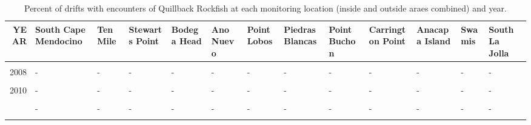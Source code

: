 \documentclass[
]{article}
\begin{document}
\begin{landscape}\begin{table}

\caption{\label{tab:percentpos}Percent of drifts with encounters of Quillback Rockfish at each monitoring location (inside and outside araes combined) and year.}
\centering
\begin{tabular}[t]{r>{\raggedright\arraybackslash}p{1.7cm}>{\raggedright\arraybackslash}p{1.2cm}>{\raggedright\arraybackslash}p{1.2cm}>{\raggedright\arraybackslash}p{1.2cm}>{\raggedright\arraybackslash}p{1.2cm}>{\raggedright\arraybackslash}p{1.2cm}>{\raggedright\arraybackslash}p{1.2cm}>{\raggedright\arraybackslash}p{1.2cm}>{\raggedright\arraybackslash}p{1.7cm}>{\raggedright\arraybackslash}p{1.2cm}>{\raggedright\arraybackslash}p{1.2cm}l}
\toprule
YEAR & South Cape Mendocino & Ten Mile & Stewarts Point & Bodega Head & Ano Nuevo & Point Lobos & Piedras Blancas & Point Buchon & Carrington Point & Anacapa Island & Swamis & South La Jolla\\
\midrule
\cellcolor{gray!6}{2007} & \cellcolor{gray!6}{-} & \cellcolor{gray!6}{-} & \cellcolor{gray!6}{-} & \cellcolor{gray!6}{-} & \cellcolor{gray!6}{-} & \cellcolor{gray!6}{-} & \cellcolor{gray!6}{-} & \cellcolor{gray!6}{-} & \cellcolor{gray!6}{-} & \cellcolor{gray!6}{-} & \cellcolor{gray!6}{-} & \cellcolor{gray!6}{-}\\
2008 & - & - & - & - & - & - & - & - & - & - & - & -\\
\cellcolor{gray!6}{2009} & \cellcolor{gray!6}{-} & \cellcolor{gray!6}{-} & \cellcolor{gray!6}{-} & \cellcolor{gray!6}{-} & \cellcolor{gray!6}{-} & \cellcolor{gray!6}{-} & \cellcolor{gray!6}{-} & \cellcolor{gray!6}{-} & \cellcolor{gray!6}{-} & \cellcolor{gray!6}{-} & \cellcolor{gray!6}{-} & \cellcolor{gray!6}{-}\\
2010 & - & - & - & - & - & - & - & - & - & - & - & -\\
\cellcolor{gray!6}{2011} & \cellcolor{gray!6}{-} & \cellcolor{gray!6}{-} & \cellcolor{gray!6}{-} & \cellcolor{gray!6}{-} & \cellcolor{gray!6}{-} & \cellcolor{gray!6}{-} & \cellcolor{gray!6}{-} & \cellcolor{gray!6}{-} & \cellcolor{gray!6}{-} & \cellcolor{gray!6}{-} & \cellcolor{gray!6}{-} & \cellcolor{gray!6}{-}\\
\addlinespace
2012 & - & - & - & - & - & - & - & - & - & - & - & -\\
\cellcolor{gray!6}{2013} & \cellcolor{gray!6}{-} & \cellcolor{gray!6}{-} & \cellcolor{gray!6}{-} & \cellcolor{gray!6}{-} & \cellcolor{gray!6}{-} & \cellcolor{gray!6}{-} & \cellcolor{gray!6}{-} & \cellcolor{gray!6}{-} & \cellcolor{gray!6}{-} & \cellcolor{gray!6}{-} & \cellcolor{gray!6}{-} & \cellcolor{gray!6}{-}\\

\end{tabular}
\end{table}
\end{landscape}
\end{document}
